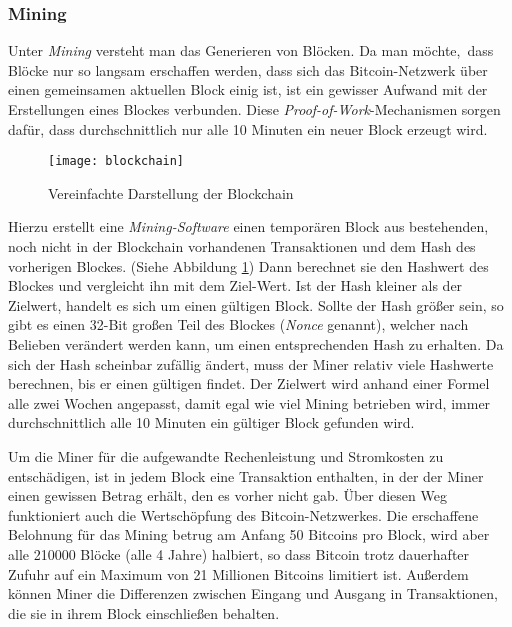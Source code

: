 \subsubsection{Mining}
\label{subsec:mining}

Unter \emph{Mining} versteht man das Generieren von Blöcken.
Da man möchte, dass Blöcke nur so langsam erschaffen werden, dass sich das Bitcoin-Netzwerk über einen gemeinsamen aktuellen Block einig ist, ist ein gewisser Aufwand mit der Erstellungen eines Blockes verbunden.
Diese \emph{Proof-of-Work}-Mechanismen sorgen dafür, dass durchschnittlich nur alle 10 Minuten ein neuer Block erzeugt wird.

\begin{figure}
    \begin{center}
        \texttt{[image: blockchain]}
        \caption{Vereinfachte Darstellung der Blockchain \parencite[3]{nakamoto}}
        \label{fig:blockchain}
    \end{center}
\end{figure}

Hierzu erstellt eine \emph{Mining-Software} einen temporären Block aus bestehenden, noch nicht in der Blockchain vorhandenen Transaktionen und dem Hash des vorherigen Blockes.
(Siehe Abbildung \ref{fig:blockchain})
Dann berechnet sie den Hashwert des Blockes und vergleicht ihn mit dem Ziel-Wert.
Ist der Hash kleiner als der Zielwert, handelt es sich um einen gültigen Block.
Sollte der Hash größer sein, so gibt es einen 32-Bit großen Teil des Blockes (\emph{Nonce} genannt), welcher nach Belieben verändert werden kann, um einen entsprechenden Hash zu erhalten.
Da sich der Hash scheinbar zufällig ändert, muss der Miner relativ viele Hashwerte berechnen, bis er einen gültigen findet.
Der Zielwert wird anhand einer Formel alle zwei Wochen angepasst, damit egal wie viel Mining betrieben wird, immer durchschnittlich alle 10 Minuten ein gültiger Block gefunden wird.

Um die Miner für die aufgewandte Rechenleistung und Stromkosten zu entschädigen, ist in jedem Block eine Transaktion enthalten, in der der Miner einen gewissen Betrag erhält, den es vorher nicht gab.
Über diesen Weg funktioniert auch die Wertschöpfung des Bitcoin-Netzwerkes.
Die erschaffene Belohnung für das Mining betrug am Anfang 50 Bitcoins pro Block, wird aber alle 210000 Blöcke (alle 4 Jahre) halbiert, so dass Bitcoin trotz dauerhafter Zufuhr auf ein Maximum von 21 Millionen Bitcoins limitiert ist.
Außerdem können Miner die Differenzen zwischen Eingang und Ausgang in Transaktionen, die sie in ihrem Block einschließen behalten.

